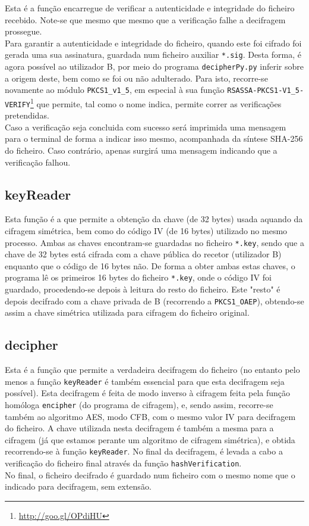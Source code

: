 \documentclass[a4paper,11pt,openright,oneside]{report}
\begin{document}
Esta é a função encarregue de verificar a autenticidade e integridade do ficheiro recebido. Note-se que mesmo que mesmo que a verificação falhe a decifragem prossegue.\\
Para garantir a autenticidade e integridade do ficheiro, quando este foi cifrado foi gerada uma sua assinatura, guardada num ficheiro auxiliar \verb|*.sig|. Desta forma, é agora possível ao utilizador B, por meio do programa \verb|decipherPy.py| inferir sobre a origem deste, bem como se foi ou não adulterado. Para isto, recorre-se novamente ao módulo \verb|PKCS1_v1_5|, em especial à sua função \verb|RSASSA-PKCS1-V1_5-VERIFY|\footnote{\url{http://goo.gl/OPdiHU}} que permite, tal como o nome indica, permite correr as verificações pretendidas.\\
Caso a verificação seja concluida com sucesso será imprimida uma mensagem para o terminal de forma a indicar isso mesmo, acompanhada da síntese SHA-256 do ficheiro. Caso contrário, apenas surgirá uma mensagem indicando que a verificação falhou.

\subsection{keyReader}

Esta função é a que permite a obtenção da chave (de 32 bytes) usada aquando da cifragem simétrica, bem como do código IV (de 16 bytes) utilizado no mesmo processo. Ambas as chaves encontram-se guardadas no ficheiro \verb|*.key|, sendo que a chave de 32 bytes está cifrada com a chave pública do recetor (utilizador B) enquanto que o código de 16 bytes não. De forma a obter ambas estas chaves, o programa lê os primeiros 16 bytes do ficheiro \verb|*.key|, onde o código IV foi guardado, procedendo-se depois à leitura do resto do ficheiro. Este "resto" é depois decifrado com a chave privada de B (recorrendo a \verb|PKCS1_OAEP|), obtendo-se assim a chave simétrica utilizada para cifragem do ficheiro original.

\subsection{decipher}

Esta é a função que permite a verdadeira decifragem do ficheiro (no entanto pelo menos a função \verb|keyReader| é também essencial para que esta decifragem seja possível). Esta decifragem é feita de modo inverso à cifragem feita pela função homóloga \verb|encipher| (do programa de cifragem), e, sendo assim, recorre-se também ao algoritmo AES, modo CFB, com o mesmo valor IV para decifragem do ficheiro. A chave utilizada nesta decifragem é também a mesma para a cifragem (já que estamos perante um algoritmo de cifragem simétrica), e obtida recorrendo-se à função \verb|keyReader|. No final da decifragem, é levada a cabo a verificação do ficheiro final através da função \verb|hashVerification|.\\
No final, o ficheiro decifrado é guardado num ficheiro com o mesmo nome que o indicado para decifragem, sem extensão.
\end{document}
